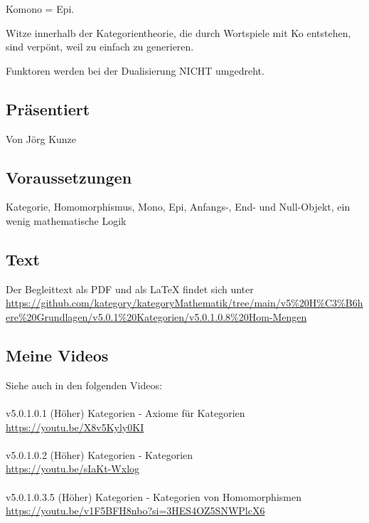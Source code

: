 \documentclass[a4paper]{amsart}
\theoremstyle{definition}
\begin{document}
Komono = Epi.

Witze innerhalb der Kategorientheorie, die durch Wortspiele mit Ko entstehen, sind verpönt, weil zu einfach zu generieren.

Funktoren werden bei der Dualisierung NICHT umgedreht.

\subsection*{Präsentiert}
Von Jörg Kunze

\subsection*{Voraussetzungen}
Kategorie, Homomorphismus, Mono, Epi, Anfangs-, End- und Null-Objekt, ein wenig mathematische Logik

\subsection*{Text}
Der Begleittext als PDF und als LaTeX findet sich unter
{\tiny
   \url{https://github.com/kategory/kategoryMathematik/tree/main/v5%20H%C3%B6here%20Grundlagen/v5.0.1%20Kategorien/v5.0.1.0.8%20Hom-Mengen}
}

\subsection*{Meine Videos}
Siehe auch in den folgenden Videos:\\
\\
v5.0.1.0.1 (Höher) Kategorien - Axiome für Kategorien\\
\url{https://youtu.be/X8v5Kyly0KI}\\
\\
v5.0.1.0.2 (Höher) Kategorien - Kategorien\\
\url{https://youtu.be/sIaKt-Wxlog}\\
\\
v5.0.1.0.3.5 (Höher) Kategorien - Kategorien von Homomorphismen\\
\url{https://youtu.be/v1F5BFH8nbo?si=3HES4OZ5SNWPlcX6}
\end{document}
